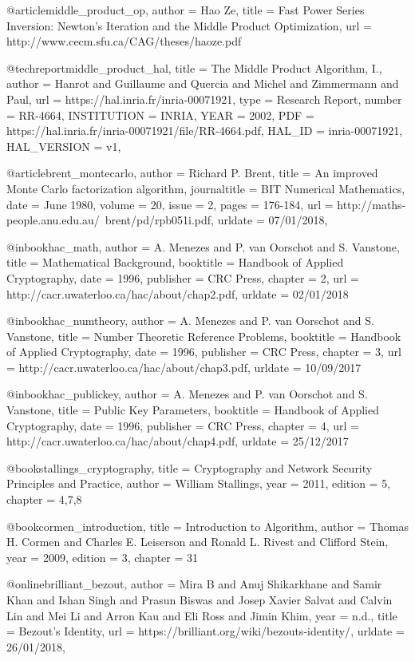 @article{middle_product_op,
	author = {Hao Ze},
	title = {Fast Power Series Inversion: Newton’s Iteration and the
Middle Product Optimization},
	url = {http://www.cecm.sfu.ca/CAG/theses/haoze.pdf}
}

@techreport{middle_product_hal,
  title = {{The Middle Product Algorithm, I.}},
  author = {Hanrot and Guillaume and Quercia and Michel and Zimmermann and Paul},
  url = {https://hal.inria.fr/inria-00071921},
  type = {Research Report},
  number = {RR-4664},
  INSTITUTION = {{INRIA}},
  YEAR = {2002},
  PDF = {https://hal.inria.fr/inria-00071921/file/RR-4664.pdf},
  HAL_ID = {inria-00071921},
  HAL_VERSION = {v1},
}

@article{brent_montecarlo,
	author = {Richard P. Brent},
	title = {An improved Monte Carlo factorization algorithm},
	journaltitle = {BIT Numerical Mathematics},
	date = {June 1980},
	volume = {20},
	issue = {2},
	pages = {176-184},
	url = {http://maths-people.anu.edu.au/~brent/pd/rpb051i.pdf},
	urldate = {07/01/2018},
}

@inbook{hac_math,
	author = {A. Menezes and P. van Oorschot and S. Vanstone},
	title = {Mathematical Background},
	booktitle = {Handbook of Applied Cryptography},
	date = {1996},
	publisher = {CRC Press},
	chapter = {2},
	url = {http://cacr.uwaterloo.ca/hac/about/chap2.pdf},
	urldate = {02/01/2018}
}

@inbook{hac_numtheory,
	author = {A. Menezes and P. van Oorschot and S. Vanstone},
	title = {Number Theoretic Reference Problems},
	booktitle = {Handbook of Applied Cryptography},
	date = {1996},
	publisher = {CRC Press},
	chapter = {3},
	url = {http://cacr.uwaterloo.ca/hac/about/chap3.pdf},
	urldate = {10/09/2017}
}

@inbook{hac_publickey,
	author = {A. Menezes and P. van Oorschot and S. Vanstone},
	title = {Public Key Parameters},
	booktitle = {Handbook of Applied Cryptography},
	date = {1996},
	publisher = {CRC Press},
	chapter = {4},
	url = {http://cacr.uwaterloo.ca/hac/about/chap4.pdf},
	urldate = {25/12/2017}
}

@book{stallings_cryptography,
	title = {Cryptography and Network Security Principles and Practice},
	author = {William Stallings},
	year = {2011},
	edition = {5},
	chapter = {4,7,8}
}

@book{cormen_introduction,
	title = {Introduction to Algorithm},
	author = {Thomas H. Cormen and Charles E. Leiserson and Ronald L. Rivest and Clifford Stein},
	year = {2009},
	edition = {3},
	chapter = {31}
}

@online{brilliant_bezout,
	author = {Mira B and Anuj Shikarkhane and Samir Khan and Ishan Singh and Prasun Biswas and Josep Xavier Salvat and	Calvin Lin and Mei Li and Arron Kau and Eli Ross and Jimin Khim},
	year = {n.d.},
	title = {Bezout's Identity},
	url = {https://brilliant.org/wiki/bezouts-identity/},
	urldate = {26/01/2018},
}

